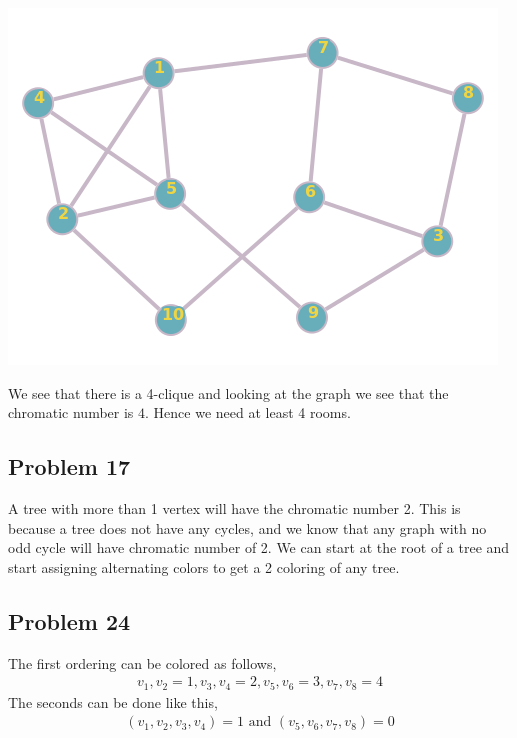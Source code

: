 \documentclass[a4paper]{report}
\begin{document}
\includegraphics[scale=.5]{graph.png}


We see that there is a 4-clique and looking at the graph we see that the chromatic number is $4$. Hence we need at least 4 rooms.

\subsection*{Problem 17}

A tree with more than 1 vertex will have the chromatic number 2. This is because a tree does not have any cycles, and we know that any  graph with no odd cycle will have chromatic number of 2. We can start at the root of a tree and start assigning alternating colors to get a 2 coloring of any tree.
\subsection*{Problem 24}

The first ordering can be colored as follows,
\begin{align*}
    v_1, v_2 = 1, v_3, v_4 = 2, v_5, v_6 = 3, v_7, v_8 = 4
\end{align*}
The seconds can be done like this,
\begin{align*}
    (v_1, v_2, v_3, v_4) = 1 \text{ and } (v_5, v_6, v_7, v_8) = 0
\end{align*}
\end{document}
